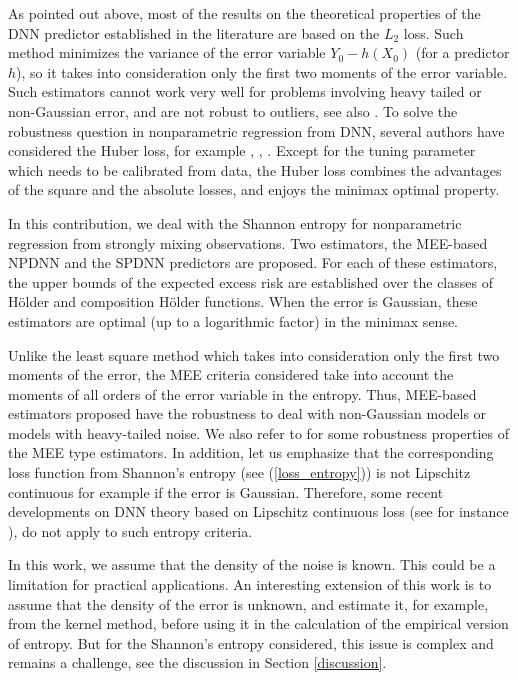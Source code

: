 \documentclass[10pt,twoside]{article}
\numberwithin{equation}{section}
\begin{document}
\medskip
 

As pointed out above, most of the results on the theoretical properties of the DNN predictor established in the literature are based on the $L_2$ loss.
Such method minimizes the variance of the error variable $Y_0-h(X_0)$ (for a predictor $h$), so it takes into consideration only the first two moments of the error variable.
%
Such estimators cannot work very well for problems involving heavy tailed or non-Gaussian error, and are not robust to outliers, see also \cite{hu2013learning}. 
%
To solve the robustness question in nonparametric regression from DNN, several authors have considered the Huber loss, for example \cite{fan2024noise}, \cite{kengne2025robust}, \cite{kengne2025deep}. Except for the tuning parameter which needs to be calibrated from data, the Huber loss combines the advantages of the square and the absolute losses, and enjoys the minimax optimal property.


\medskip

 In this contribution, we deal with the Shannon entropy for nonparametric regression from strongly mixing observations.
 Two estimators, the MEE-based NPDNN and the SPDNN predictors are proposed. For each of these estimators, the upper bounds of the expected excess risk are established over the classes of H\"older and composition H\"older functions. 
When the error is Gaussian, these estimators are optimal (up to a logarithmic factor) in the minimax sense. 
 
\medskip 
 
 Unlike the least square method which takes into consideration only the first two moments of the error, the MEE criteria considered take into account the moments of all orders of the error variable in the entropy.
 Thus, MEE-based estimators proposed have the robustness to deal with non-Gaussian models or models with heavy-tailed noise. We also refer to \cite{erdogmus2003convergence} for some robustness properties of the MEE type estimators.
%
In addition, let us emphasize that the corresponding loss function from Shannon's entropy (see (\ref{loss_entropy})) is not Lipschitz continuous for example if the error is Gaussian. 
Therefore, some recent developments on DNN theory based on Lipschitz continuous loss (see for instance \cite{kengne2025general}), do not apply to such entropy criteria. 


\medskip

In this work, we assume that the density of the noise is known. This could be a limitation for practical applications.
An interesting extension of this work is to assume that the density of the error is unknown, and estimate it, for example, from the kernel method, before using it in the calculation of the empirical version of entropy.
%
But for the Shannon's entropy considered, this issue is complex and remains a challenge, see the discussion in Section \ref{discussion}.
\end{document}
